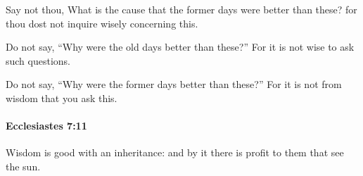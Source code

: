 			\begin{versebox}
					\item[BHS] 
					\item[LXX] 
					\item[ASV] Say not thou, What is the cause that the former days were better than these? for thou dost not inquire wisely concerning this.
					\item[NIV] Do not say, “Why were the old days better than these?” For it is not wise to ask such questions.
					\item[NRSV] Do not say, “Why were the former days better than these?” For it is not from wisdom that you ask this.
			\end{versebox}

		\paragraph{Ecclesiastes 7:11} %
			\label{ECCLESIASTES-7-11}

			Wisdom is good with an inheritance: and by it there is profit to them that see the sun.

